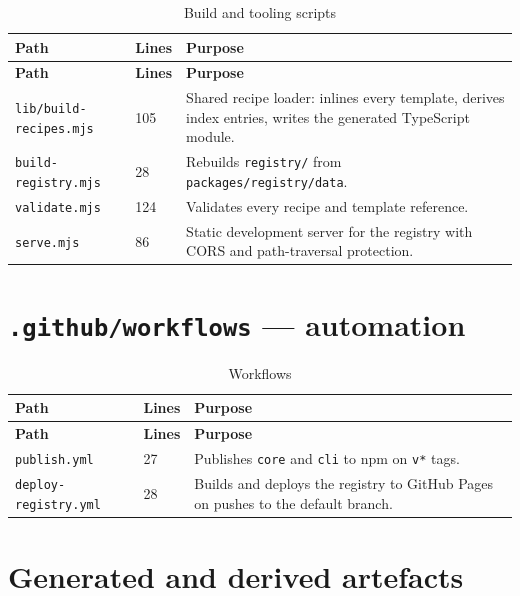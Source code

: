 \begin{longtable}{@{}L{5.4cm}L{2.2cm}L{6.8cm}@{}}
\caption{Build and tooling scripts}\\
\toprule
\textbf{Path} & \textbf{Lines} & \textbf{Purpose} \\
\midrule
\endfirsthead
\toprule
\textbf{Path} & \textbf{Lines} & \textbf{Purpose} \\
\midrule
\endhead
\texttt{lib/build-recipes.mjs} & 105 & Shared recipe loader: inlines every template,
derives index entries, writes the generated TypeScript module. \\
\texttt{build-registry.mjs} & 28 & Rebuilds \texttt{registry/} from
\texttt{packages/registry/data}. \\
\texttt{validate.mjs} & 124 & Validates every recipe and template reference. \\
\texttt{serve.mjs} & 86 & Static development server for the registry with CORS and
path-traversal protection. \\
\bottomrule
\end{longtable}

\section{\texttt{.github/workflows} --- automation}

\begin{longtable}{@{}L{5.4cm}L{2.2cm}L{6.8cm}@{}}
\caption{Workflows}\\
\toprule
\textbf{Path} & \textbf{Lines} & \textbf{Purpose} \\
\midrule
\endfirsthead
\toprule
\textbf{Path} & \textbf{Lines} & \textbf{Purpose} \\
\midrule
\endhead
\texttt{publish.yml} & 27 & Publishes \texttt{core} and \texttt{cli} to npm on
\texttt{v*} tags. \\
\texttt{deploy-registry.yml} & 28 & Builds and deploys the registry to GitHub Pages
on pushes to the default branch. \\
\bottomrule
\end{longtable}

\section{Generated and derived artefacts}


